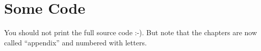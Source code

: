 \chapter{Some Code}

You should not print the full source code :-). But note that the chapters are now called ``appendix'' and numbered with letters.